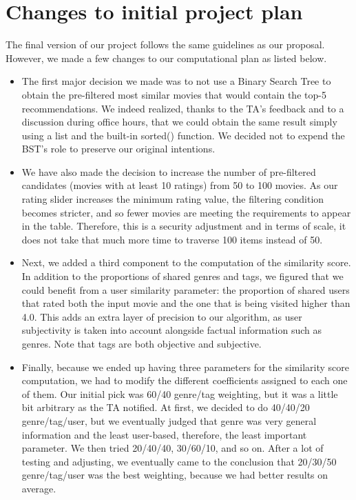 \documentclass[fontsize=11pt]{article}
\begin{document}
\section*{Changes to initial project plan}

The final version of our project follows the same guidelines as our proposal. However, we made a few changes to our computational plan as listed below. 
    \begin{itemize}
    \item The first major decision we made was to not use a Binary Search Tree to obtain the pre-filtered most similar movies that would contain the top-5 recommendations. We indeed realized, thanks to the TA's feedback and to a discussion during office hours, that we could obtain the same result simply using a list and the built-in sorted() function. We decided not to expend the BST's role to preserve our original intentions.  
    \item We have also made the decision to increase the number of pre-filtered candidates (movies with at least 10 ratings) from 50 to 100 movies. As our rating slider increases the minimum rating value, the filtering condition becomes stricter, and so fewer movies are meeting the requirements to appear in the table. Therefore, this is a security adjustment and in terms of scale, it does not take that much more time to traverse 100 items instead of 50.
    \item Next, we added a third component to the computation of the similarity score. In addition to the proportions of shared genres and tags, we figured that we could benefit from a user similarity parameter: the proportion of shared users that rated both the input movie and the one that is being visited higher than 4.0. This adds an extra layer of precision to our algorithm, as user subjectivity is taken into account alongside factual information such as genres. Note that tags are both objective and subjective.
    \item Finally, because we ended up having three parameters for the similarity score computation, we had to modify the different coefficients assigned to each one of them. Our initial pick was 60/40 genre/tag weighting, but it was a little bit arbitrary as the TA notified. At first, we decided to do 40/40/20 genre/tag/user, but we eventually judged that genre was very general information and the least user-based, therefore, the least important parameter. We then tried 20/40/40, 30/60/10, and so on. After a lot of testing and adjusting, we eventually came to the conclusion that 20/30/50 genre/tag/user was the best weighting, because we had better results on average. 
    \end{itemize}
\end{document}
